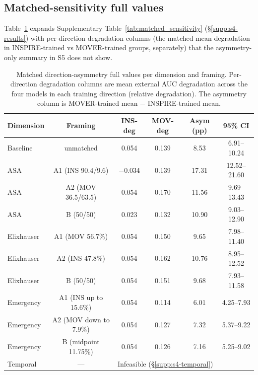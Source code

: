 \documentclass[11pt,a4paper]{article}
\begin{document}
\subsection{Matched-sensitivity full values}\label{supp:s6-robustness-full}

Table~\ref{tab:robustness_full} expands Supplementary Table~\ref{tab:matched_sensitivity}
(§\ref{supp:s4-results}) with per-direction degradation columns (the matched
mean degradation in INSPIRE-trained vs MOVER-trained groups, separately)
that the asymmetry-only summary in S5 does not show.

\begin{table}[H]
\centering
\caption{Matched direction-asymmetry full values per dimension and framing.
Per-direction degradation columns are mean external AUC degradation across
the four models in each training direction (relative degradation). The
asymmetry column is MOVER-trained mean $-$ INSPIRE-trained mean.}
\label{tab:robustness_full}
\setlength{\tabcolsep}{4pt}
\small
\begin{tabular}{lccccc}
\toprule
\textbf{Dimension} & \textbf{Framing} & \textbf{INS-deg} & \textbf{MOV-deg} & \textbf{Asym (pp)} & \textbf{95\% CI} \\
\midrule
Baseline & unmatched      & 0.054 & 0.139 &  8.53 & 6.91--10.24 \\
ASA      & A1 (INS 90.4/9.6) & $-$0.034 & 0.139 & 17.31 & 12.52--21.60 \\
ASA      & A2 (MOV 36.5/63.5) & 0.054 & 0.170 & 11.56 & 9.69--13.43 \\
ASA      & B (50/50)        & 0.023 & 0.132 & 10.90 & 9.03--12.90 \\
Elixhauser & A1 (MOV 56.7\%)  & 0.054 & 0.150 &  9.65 & 7.98--11.40 \\
Elixhauser & A2 (INS 47.8\%)  & 0.054 & 0.162 & 10.76 & 8.95--12.52 \\
Elixhauser & B (50/50)        & 0.054 & 0.151 &  9.68 & 7.93--11.58 \\
Emergency  & A1 (INS up to 15.6\%) & 0.054 & 0.114 &  6.01 & 4.25--7.93 \\
Emergency  & A2 (MOV down to 7.9\%) & 0.054 & 0.127 &  7.32 & 5.37--9.22 \\
Emergency  & B (midpoint 11.75\%)  & 0.054 & 0.126 &  7.16 & 5.25--9.02 \\
Temporal & ---             & \multicolumn{4}{l}{Infeasible (\S\ref{supp:s4-temporal})} \\
\bottomrule
\end{tabular}
\end{table}
\end{document}
